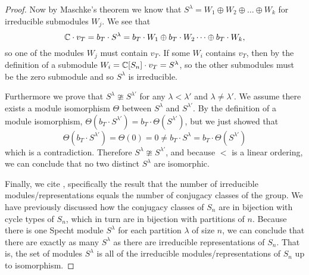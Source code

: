 \documentclass[12pt,twoside]{reedthesis}
\theoremstyle{plain}   %
\theoremstyle{definition}
\theoremstyle{remark}
\numberwithin{equation}{section}
\begin{document}
\begin{proof}
    Now by Maschke's theorem we know that $S^\lambda = W_1 \oplus W_2 \oplus \dots \oplus W_k$ for irreducible submodules $W_j$.
    We see that
    \[\mathbb{C} \cdot v_T = b_T \cdot S^\lambda = b_T \cdot W_1 \oplus b_T \cdot W_2 \dots \oplus b_T \cdot W_k,\]
    so one of the modules $W_j$ must contain $v_T$.
    If some $W_i$ contains $v_T$, then by the definition of a submodule $W_i = \mathbb{C} [S_n] \cdot v_T = S^\lambda$, so
    the other submodules must be the zero submodule and so $S^\lambda$ is irreducible.
    \par
    Furthermore we prove that $S^\lambda  \ncong S^{\lambda'}$ for any $\lambda < \lambda'$ and $\lambda \neq \lambda'$.
    We assume there exists a module isomorphism $\Theta$ between $S^\lambda$ and $S^{\lambda'}$.
    By the definition of a module isomorphism, $\Theta(b_T \cdot S^{\lambda'}) = b_T \cdot \Theta( S^{\lambda'})$,
    but we just showed that
    \[\Theta(b_T \cdot S^{\lambda'}) = \Theta(0) = 0 \neq b_T \cdot S^\lambda = b_T \cdot \Theta( S^{\lambda'})\]
    which is a contradiction. Therefore $S^\lambda \ncong S^{\lambda'}$, and because $<$ is a linear ordering, we can conclude that
    no two distinct $S^\lambda$ are isomorphic. \par
    Finally, we cite \cite[Proposition 1.10.1]{sagan}, specifically the result that the number of irreducible modules/representations equals
    the number of conjugacy classes of the group. We have previously discussed how the conjugacy classes of $S_n$ are in bijection with cycle types of $S_n$,
    which in turn are in bijection with partitions of $n$.
    Because there is one Specht module $S^\lambda$ for each partition $\lambda$ of size $n$,
    we can conclude that there are exactly as many $S^\lambda$ as there are irreducible representations of $S_n$.
    That is, the set of modules $S^\lambda$ is all of the irreducible modules/representations of $S_n$ up to isomorphism.
  \end{proof}
\end{document}
